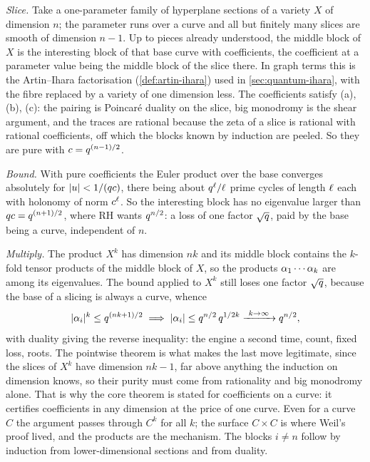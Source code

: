 \emph{Slice.} Take a one-parameter family of hyperplane sections of a variety $X$ of dimension $n$; the
parameter runs over a curve and all but finitely many slices are smooth of dimension $n-1$. Up to pieces
already understood, the middle block of $X$ is the interesting block of that base curve with coefficients,
the coefficient at a parameter value being the middle block of the slice there. In graph terms this is the
Artin--Ihara factorisation (\cref{def:artin-ihara}) used in \cref{sec:quantum-ihara}, with the fibre
replaced by a variety of one dimension less. The coefficients satisfy (a), (b), (c): the pairing is
Poincar\'e duality on the slice, big monodromy is the shear argument, and the traces are rational because
the zeta of a slice is rational with rational coefficients, off which the blocks known by induction are
peeled. So they are pure with $c = q^{(n-1)/2}$.

\emph{Bound.} With pure coefficients the Euler product over the base converges absolutely for $|u| <
1/(qc)$, there being about $q^{\ell}/\ell$ prime cycles of length $\ell$ each with holonomy of norm
$c^{\ell}$. So the interesting block has no eigenvalue larger than $qc = q^{(n+1)/2}$,
where RH wants $q^{n/2}$: a loss of one factor $\sqrt{q}$, paid by the base being a curve, independent
of $n$.

\emph{Multiply.} The product $X^k$ has dimension $nk$ and its middle block contains the $k$-fold tensor
products of the middle block of $X$, so the products $\alpha_{1}\cdots\alpha_{k}$ are among its eigenvalues.
The bound applied to $X^k$ still loses one factor $\sqrt{q}$, because the base of a slicing is always a
curve, whence
\[
  |\alpha_{i}|^k \le q^{(nk+1)/2} \implies
  |\alpha_{i}| \le q^{n/2}\,q^{1/2k} \xrightarrow{\ k\to\infty\ } q^{n/2},\]
with duality giving the reverse inequality: the engine a second time, count, fixed loss, roots. The
pointwise theorem is what makes the last move legitimate, since the slices of $X^k$ have dimension $nk-1$,
far above anything the induction on dimension knows, so their purity must come from rationality and big
monodromy alone. That is why the core theorem is stated for coefficients on a curve: it certifies
coefficients in any dimension at the price of one curve. Even for a curve $C$ the argument passes through
$C^k$ for all $k$; the surface $C\times C$ is where Weil's proof lived, and the products are the mechanism.
The blocks $i\ne n$ follow by induction from lower-dimensional sections and from duality.

